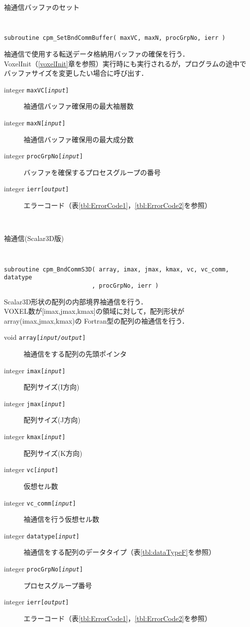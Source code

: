 \begin{spacing}{0.8}
\begin{itembox}[l]{袖通信バッファのセット}
{\tt
\begin{verbatim}
subroutine cpm_SetBndCommBuffer( maxVC, maxN, procGrpNo, ierr )
\end{verbatim}
}
袖通信で使用する転送データ格納用バッファの確保を行う．\\
VoxelInit（\ref{voxelInit}章を参照）実行時にも実行されるが，プログラムの途中で
バッファサイズを変更したい場合に呼び出す．
\begin{description}
\item[integer {\tt maxVC[{\it input}]}] 袖通信バッファ確保用の最大袖層数
\item[integer {\tt maxN[{\it input}]}] 袖通信バッファ確保用の最大成分数
\item[integer {\tt procGrpNo[{\it input}]}] バッファを確保するプロセスグループの番号
\item[integer {\tt ierr[{\it output}]}] エラーコード（表\ref{tbl:ErrorCode1}，\ref{tbl:ErrorCode2}を参照）
\end{description}
\end{itembox}\\
\end{spacing}

\begin{spacing}{0.8}
\begin{itembox}[l]{袖通信(Scalar3D版)}
{\tt
\begin{verbatim}
subroutine cpm_BndCommS3D( array, imax, jmax, kmax, vc, vc_comm, datatype
                         , procGrpNo, ierr )
\end{verbatim}
}
Scalar3D形状の配列の内部境界袖通信を行う．\\
VOXEL数が[imax,jmax,kmax]の領域に対して，配列形状がarray(imax,jmax,kmax)の
Fortran型の配列の袖通信を行う．
\begin{description}
\item[void    {\tt array[{\it input/output}]}] 袖通信をする配列の先頭ポインタ
\item[integer {\tt imax[{\it input}]}] 配列サイズ(I方向)
\item[integer {\tt jmax[{\it input}]}] 配列サイズ(J方向)
\item[integer {\tt kmax[{\it input}]}] 配列サイズ(K方向)
\item[integer {\tt vc[{\it input}]}] 仮想セル数
\item[integer {\tt vc\_comm[{\it input}]}] 袖通信を行う仮想セル数
\item[integer {\tt datatype[{\it input}]}] 袖通信をする配列のデータタイプ（表\ref{tbl:dataTypeF}を参照）
\item[integer {\tt procGrpNo[{\it input}]}] プロセスグループ番号
\item[integer {\tt ierr[{\it output}]}] エラーコード（表\ref{tbl:ErrorCode1}，\ref{tbl:ErrorCode2}を参照）
\end{description}
\end{itembox}\\
\end{spacing}

